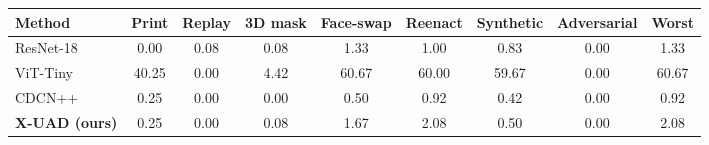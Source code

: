 \begin{tabular}{lcccccccc}
\toprule
Method & Print & Replay & 3D mask & Face-swap & Reenact & Synthetic & Adversarial & Worst \\
\midrule
ResNet-18~\cite{he2016resnet} & 0.00 & 0.08 & 0.08 & 1.33 & 1.00 & 0.83 & 0.00 & 1.33 \\
ViT-Tiny~\cite{dosovitskiy2021vit} & 40.25 & 0.00 & 4.42 & 60.67 & 60.00 & 59.67 & 0.00 & 60.67 \\
CDCN++~\cite{yu2020cdcn} & 0.25 & 0.00 & 0.00 & 0.50 & 0.92 & 0.42 & 0.00 & 0.92 \\
\textbf{X-UAD (ours)} & 0.25 & 0.00 & 0.08 & 1.67 & 2.08 & 0.50 & 0.00 & 2.08 \\
\bottomrule
\end{tabular}